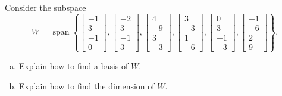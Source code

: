 
\begin{exerciseStatement}


Consider the subspace \[W=\operatorname{span}  \left\{ \left[\begin{array}{c}
-1 \\
3 \\
-1 \\
0
\end{array}\right] , \left[\begin{array}{c}
-2 \\
3 \\
-1 \\
3
\end{array}\right] , \left[\begin{array}{c}
4 \\
-9 \\
3 \\
-3
\end{array}\right] , \left[\begin{array}{c}
3 \\
-3 \\
1 \\
-6
\end{array}\right] , \left[\begin{array}{c}
0 \\
3 \\
-1 \\
-3
\end{array}\right] , \left[\begin{array}{c}
-1 \\
-6 \\
2 \\
9
\end{array}\right] \right\} .\]


\begin{enumerate}[(a)]
\item  Explain how to find a basis of \(W\).
\item  Explain how to find the dimension of \(W\).
\end{enumerate}
    
\end{exerciseStatement}
    
